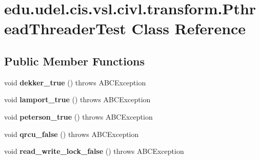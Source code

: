 \hypertarget{classedu_1_1udel_1_1cis_1_1vsl_1_1civl_1_1transform_1_1PthreadThreaderTest}{}\section{edu.\+udel.\+cis.\+vsl.\+civl.\+transform.\+Pthread\+Threader\+Test Class Reference}
\label{classedu_1_1udel_1_1cis_1_1vsl_1_1civl_1_1transform_1_1PthreadThreaderTest}
\subsection*{Public Member Functions}
\begin{DoxyCompactItemize}
\item 
\hypertarget{classedu_1_1udel_1_1cis_1_1vsl_1_1civl_1_1transform_1_1PthreadThreaderTest_a121bfa632a4fb99f5477aba1c6ff55e7}{}void {\bfseries dekker\+\_\+true} ()  throws A\+B\+C\+Exception \label{classedu_1_1udel_1_1cis_1_1vsl_1_1civl_1_1transform_1_1PthreadThreaderTest_a121bfa632a4fb99f5477aba1c6ff55e7}

\item 
\hypertarget{classedu_1_1udel_1_1cis_1_1vsl_1_1civl_1_1transform_1_1PthreadThreaderTest_a8da214c9cd0c378d6f82fae1584a8235}{}void {\bfseries lamport\+\_\+true} ()  throws A\+B\+C\+Exception \label{classedu_1_1udel_1_1cis_1_1vsl_1_1civl_1_1transform_1_1PthreadThreaderTest_a8da214c9cd0c378d6f82fae1584a8235}

\item 
\hypertarget{classedu_1_1udel_1_1cis_1_1vsl_1_1civl_1_1transform_1_1PthreadThreaderTest_ae0ec7f0fd9712792fb4ee045065b3021}{}void {\bfseries peterson\+\_\+true} ()  throws A\+B\+C\+Exception \label{classedu_1_1udel_1_1cis_1_1vsl_1_1civl_1_1transform_1_1PthreadThreaderTest_ae0ec7f0fd9712792fb4ee045065b3021}

\item 
\hypertarget{classedu_1_1udel_1_1cis_1_1vsl_1_1civl_1_1transform_1_1PthreadThreaderTest_a86781c6b072d01030df1b1fa25e7d85c}{}void {\bfseries qrcu\+\_\+false} ()  throws A\+B\+C\+Exception \label{classedu_1_1udel_1_1cis_1_1vsl_1_1civl_1_1transform_1_1PthreadThreaderTest_a86781c6b072d01030df1b1fa25e7d85c}

\item 
\hypertarget{classedu_1_1udel_1_1cis_1_1vsl_1_1civl_1_1transform_1_1PthreadThreaderTest_a6ce2cf495ae93a8b1d5c7794975b41a8}{}void {\bfseries read\+\_\+write\+\_\+lock\+\_\+false} ()  throws A\+B\+C\+Exception \label{classedu_1_1udel_1_1cis_1_1vsl_1_1civl_1_1transform_1_1PthreadThreaderTest_a6ce2cf495ae93a8b1d5c7794975b41a8}


\end{DoxyCompactItemize}
